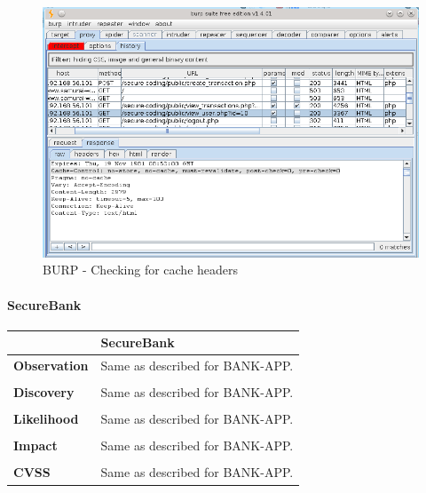\begin{figure}[ht]
	\centering
		\includegraphics[width=.8\linewidth]{figures/OTG-AUTHN-006.png}
		\caption{BURP - Checking for cache headers}
	\label{fig:burp_cache_header}
\end{figure}
\paragraph{SecureBank} \mbox{}
\begin{longtable*}{p{.20\textwidth} | p{.80\textwidth}}
    \hline
    & \textbf{SecureBank} \\
    \hline
    \textbf{Observation} &
       Same as described for BANK-APP.
    \\\\
    \textbf{Discovery} &
    Same as described for BANK-APP.
    \\\\
    \textbf{Likelihood} &
        Same as described for BANK-APP.
    \\\\
    \textbf{Impact} &
        Same as described for BANK-APP.
    \\\\
    \textbf{CVSS} &
        Same as described for BANK-APP.
    \\
    \hline
\end{longtable*}
\clearpage